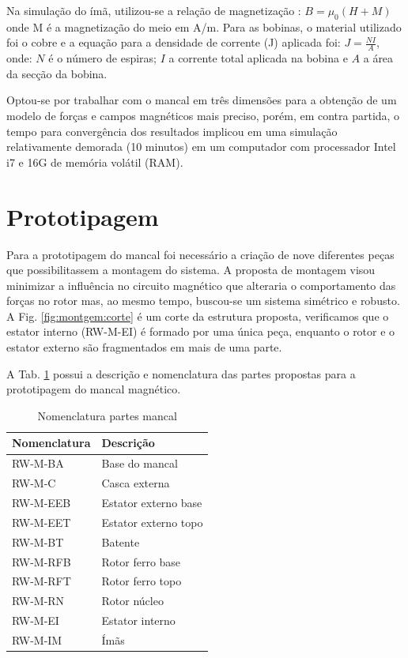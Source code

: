 Na simulação do ímã, utilizou-se a relação de magnetização : $B = \mu_0 (H + M)$ onde M é a magnetização do meio em A/m. Para as bobinas, o material utilizado foi o cobre e a equação para a densidade de corrente (J) aplicada foi: $ J = \frac{N I}{A}$, onde: $N$ é o número de espiras; $I$ a corrente total aplicada na bobina e $A$ a área da secção da bobina.

Optou-se por trabalhar com o mancal em três dimensões para a obtenção de um modelo de forças e campos magnéticos mais preciso, porém, em contra partida, o tempo para convergência dos resultados implicou em uma simulação relativamente demorada (10 minutos) em um computador com processador Intel i7 e 16G de memória volátil (RAM).

\section{Prototipagem}
 
Para a prototipagem do mancal foi necessário a criação de nove diferentes peças que possibilitassem a montagem do sistema. A proposta de montagem visou minimizar a influência no circuito magnético que alteraria o comportamento das forças no rotor mas, ao mesmo tempo, buscou-se um sistema simétrico e robusto.  A Fig. \ref{fig:montgem:corte} é um corte da estrutura proposta, verificamos que o estator interno (RW-M-EI) é formado por uma única peça, enquanto o rotor e o estator externo são fragmentados em mais de uma parte.

A Tab. \ref{Tab:nomenclatura:mancal} possui a descrição e nomenclatura das partes propostas para a prototipagem do mancal magnético.

 \begin{table}[ht!]
 	\centering
 	\begin{tabular}{l l}
 		Nomenclatura & Descrição  \\ \hline
 		RW-M-BA 		&	Base do mancal \\
 		RW-M-C   		 &	Casca externa\\
 		RW-M-EEB	  & Estator externo base\\
 		RW-M-EET & 	Estator externo topo\\
 		RW-M-BT & 	Batente\\
 		RW-M-RFB & 	Rotor ferro base\\
 		RW-M-RFT	&  Rotor ferro topo\\
 		RW-M-RN & 	Rotor núcleo\\
 		RW-M-EI	&  Estator interno\\
		RW-M-IM	&  Ímãs 
 	\end{tabular} 
 	\caption{Nomenclatura partes mancal}
 	\label{Tab:nomenclatura:mancal} 
 \end{table} 

